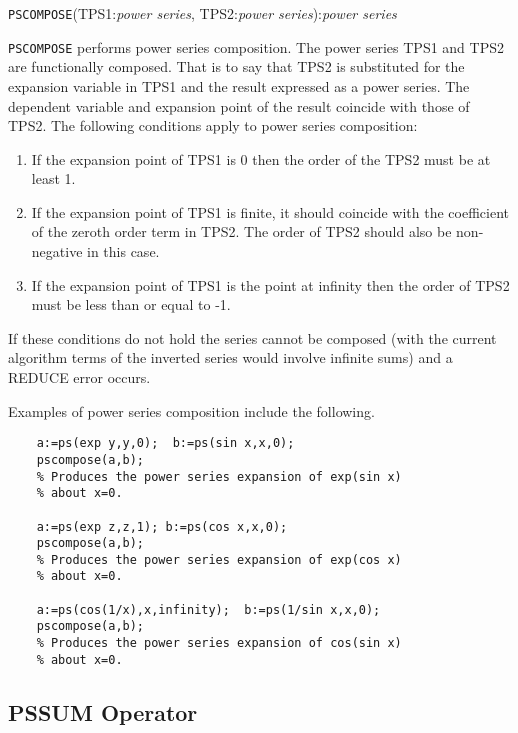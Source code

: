 \hspace*{2em} {\tt PSCOMPOSE}(TPS1:{\em power series},
TPS2:{\em power series}):{\em power series}

{\tt PSCOMPOSE} performs power series composition.
The power series TPS1 and TPS2 are functionally composed.
That is to say that TPS2 is substituted for the expansion
variable in TPS1 and the result expressed as a power series. The
dependent variable and expansion point of the result coincide with
those of TPS2.  The following conditions apply to power series
composition:

\begin{enumerate}
\item If the expansion point of TPS1 is 0 then the order of the
TPS2 must be at least 1.

\item If the expansion point of TPS1 is finite, it should
coincide with the coefficient of the zeroth order term in TPS2.
The order of TPS2 should also be non-negative in this case.

\item If the expansion point of TPS1 is the point at infinity
then the order of TPS2 must be less than or equal to -1.

\end{enumerate}

If these conditions do not hold the series cannot be composed (with
the current algorithm terms of the inverted series would involve
infinite sums) and a REDUCE error occurs.

\noindent Examples of power series composition include the following.

\begin{verbatim}
    a:=ps(exp y,y,0);  b:=ps(sin x,x,0); 
    pscompose(a,b);
    % Produces the power series expansion of exp(sin x)
    % about x=0.

    a:=ps(exp z,z,1); b:=ps(cos x,x,0);
    pscompose(a,b);
    % Produces the power series expansion of exp(cos x)
    % about x=0.

    a:=ps(cos(1/x),x,infinity);  b:=ps(1/sin x,x,0);
    pscompose(a,b);
    % Produces the power series expansion of cos(sin x)
    % about x=0.
\end{verbatim}

\subsection{PSSUM Operator}

